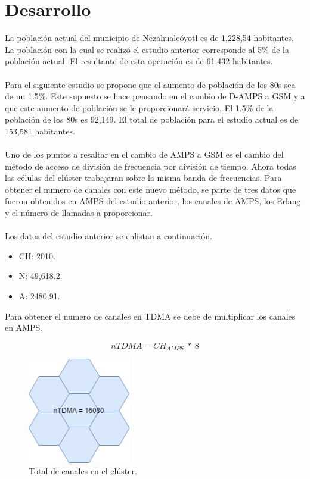 \documentclass[11pt,letterpaper]{article}
\begin{document}


\newpage
\tableofcontents
\listoffigures
\listoftables

\newpage
\section{Desarrollo}
La población actual del municipio de Nezahualcóyotl es de 1,228,54 habitantes.
La población con la cual se realizó el estudio anterior corresponde al 5\% de 
la población actual. El resultante de esta operación es de 61,432 habitantes. 
\\ \\
Para el siguiente estudio se propone que el aumento de población de los 80s 
sea de un 1.5\%. Este supuesto se hace pensando en el cambio de D-AMPS a GSM y 
a que este aumento de población se le proporcionará servicio. El 1.5\% de la 
población de los 80s es 92,149. El total de población para el estudio actual 
es de 153,581 habitantes.
\\ \\
Uno de los puntos a resaltar en el cambio de AMPS a GSM es el cambio del 
método de acceso de división de frecuencia por división de tiempo. Ahora todas 
las células del clúster trabajaran sobre la misma banda de frecuencias. Para 
obtener el numero de canales con este nuevo método, se parte de tres datos 
que fueron obtenidos en AMPS del estudio anterior, los canales de AMPS, los 
Erlang y el número de llamadas a proporcionar.
\\ \\
Los datos del estudio anterior se enlistan a continuación.
\begin{itemize}
    \item CH: 2010.
    \item N: 49,618.2.
    \item A: 2480.91.
\end{itemize}

Para obtener el numero de canales en TDMA se debe de multiplicar los canales 
en AMPS.

\begin{equation}
    nTDMA=CH_{AMPS} \ * \ 8
\end{equation}

\begin{figure}[ht]
    \centering
    \includegraphics[width=0.4\textwidth]{imagenes/cluster.png}
    \caption{Total de canales en el clúster.}
\end{figure}
\end{document}

